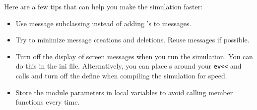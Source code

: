 Here are a few tips that can help you make the simulation faster:
\begin{itemize}
  \item{Use message subclassing instead of adding 's to messages.}
  \item{Try to minimize message creations and deletions. Reuse
    messages if possible.}
  \item{Turn off the display of screen messages when you run the
    simulation.  You can do this in the ini file. Alternatively, you
    can place s around your \texttt{ev<<} and
     calls and turn off the define when compiling
    the simulation for speed.}
  \item{Store the module parameters in local variables to avoid
    calling  member functions every time.}
\end{itemize}



